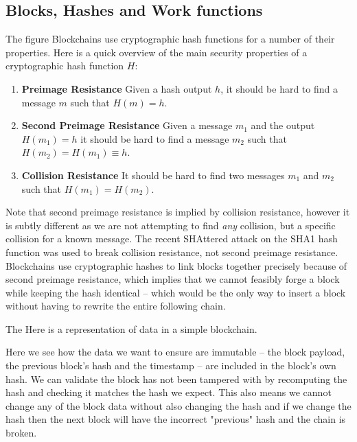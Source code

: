 \subsection{Blocks, Hashes and Work functions}
\label{ch:blockchain:structure:basics}

The figure Blockchains use cryptographic hash functions for a number of their properties. Here is a quick overview of the main security properties of a cryptographic hash function $H$:

\begin{enumerate}
    \item \textbf{Preimage Resistance} Given a hash output $h$, it should be hard to find a message $m$ such that $H(m) = h$.
    \item \textbf{Second Preimage Resistance} Given a message $m_1$ and the output $H(m_1) = h$ it should be hard to find a message $m_2$ such that $H(m_2) = H(m_1) \equiv h$.
    \item \textbf{Collision Resistance} It should be hard to find two messages $m_1$ and $m_2$ such that $H(m_1) = H(m_2)$.
\end{enumerate}

Note that second preimage resistance is implied by collision resistance, however it is subtly different as we are not attempting to find \emph{any} collision, but a specific collision for a known message. The recent SHAttered \cite{katz_first_2017} attack on the SHA1 hash function was used to break collision resistance, not second preimage resistance. Blockchains use cryptographic hashes to link blocks together precisely because of second preimage resistance, which implies that we cannot feasibly forge a block while keeping the hash identical -- which would be the only way to insert a block without having to rewrite the entire following chain.

The
Here is a representation of data in a simple blockchain.


Here we see how the data we want to ensure are immutable -- the block payload, the previous block's hash and the timestamp -- are included in the block's own hash.  We can validate the block has not been tampered with by recomputing the hash and checking it matches the hash we expect. This also means we cannot change any of the block data without also changing the hash and if we change the hash then the next block will have the incorrect "previous" hash and the chain is broken.

